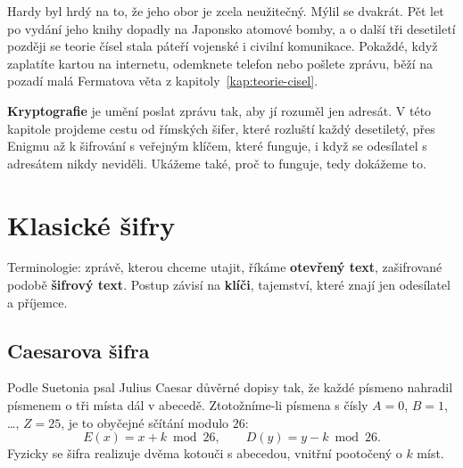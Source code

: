 \label{kap:kryptografie}

Hardy byl hrdý na to, že jeho obor je zcela neužitečný. Mýlil se dvakrát. Pět let po vydání jeho knihy dopadly na Japonsko atomové bomby, a o další tři desetiletí později se teorie čísel stala páteří vojenské i civilní komunikace. Pokaždé, když zaplatíte kartou na internetu, odemknete telefon nebo pošlete zprávu, běží na pozadí malá Fermatova věta z kapitoly~\ref{kap:teorie-cisel}.

\textbf{Kryptografie} je umění poslat zprávu tak, aby jí rozuměl jen adresát. V této kapitole projdeme cestu od římských šifer, které rozluští každý desetiletý, přes Enigmu až k šifrování s veřejným klíčem, které funguje, i když se odesílatel s adresátem nikdy neviděli. Ukážeme také, proč to funguje, tedy dokážeme to.

\section{Klasické šifry}

Terminologie: zprávě, kterou chceme utajit, říkáme \textbf{otevřený text}, zašifrované podobě \textbf{šifrový text}. Postup závisí na \textbf{klíči}, tajemství, které znají jen odesílatel a příjemce.

\subsection{Caesarova šifra}

Podle Suetonia psal Julius Caesar důvěrné dopisy tak, že každé písmeno nahradil písmenem o tři místa dál v abecedě. Ztotožníme-li písmena s čísly $A = 0$, $B = 1$, \dots, $Z = 25$, je to obyčejné sčítání modulo $26$:
\begin{equation*}
  E(x) = x + k\bmod 26,\qquad D(y) = y - k\bmod 26.
\end{equation*}
Fyzicky se šifra realizuje dvěma kotouči s abecedou, vnitřní pootočený o $k$ míst.

